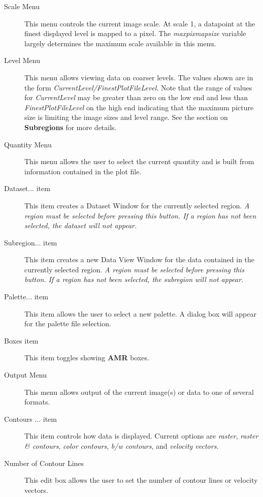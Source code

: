 \documentclass{article}
\begin{document}
\begin{description}
\item[Scale Menu]  This menu controls the current image scale.  At
scale 1, a datapoint at the finest displayed level is mapped to a pixel.
The {\em maxpixmapsize} variable largely determines the maximum scale available
in this menu.

\item[Level Menu] This menu allows viewing data on coarser levels.
The values shown are in the form {\em CurrentLevel/FinestPlotFileLevel}.
Note that the range of values for {\em CurrentLevel} may be greater than
zero on the low end and less than {\em FinestPlotFileLevel} on the high
end indicating that the maximum picture size is limiting the image sizes
and level range.  See the section on {\bf Subregions} for more details.

\item[Quantity Menu]  This menu allows the user to select the current
quantity and is built from information contained in the plot file.

\item[Dataset... item]  This item creates a Dataset Window for the
currently selected region.  {\em A region must be selected before
pressing this button.  If a region has not been selected, the dataset
will not appear.}

\item[Subregion...  item]  This item creates a new Data View Window for the
data contained in the currently selected region.  {\em A region must be
selected before pressing this button.  If a region has not been selected,
the subregion will not appear.}

\item[Palette... item]  This item allows the user to select a new palette.
A dialog box will appear for the palette file selection.

\item[Boxes item]  This item toggles showing {\bf AMR} boxes.

\item[Output Menu]  This menu allows output of the current image(s) or
data to one of several formats.

\item[Contours ... item]  This item controls how data is displayed.  Current
options are {\em raster}, {\em raster \& contours}, {\em color contours},
{\em b/w contours}, and {\em velocity vectors}.

\item[Number of Contour Lines]  This edit box allows the user to set
the number of contour lines or velocity vectors.


\end{description}
\end{document}
